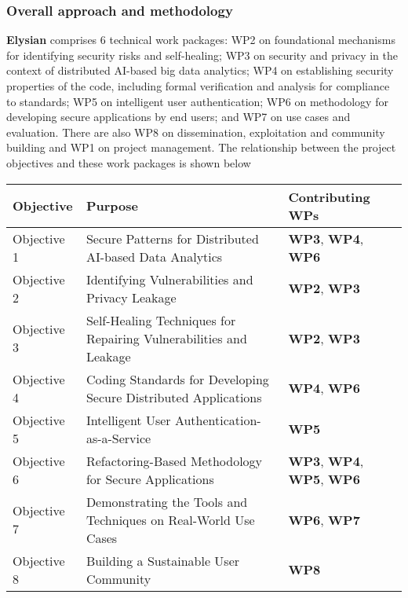 \documentclass[a4paper,11pt]{article}
\newcommand{\project}[1]{\textbf{#1}\xspace}
\newcommand{\SECURITY}{\project{Elysian}}
\newcommand{\TheProject}{\SECURITY}
\begin{document}
\subsubsection{Overall approach and methodology}


\TheProject{} comprises 6 technical work packages: WP2 on foundational mechanisms for identifying security risks and self-healing; WP3 on security and privacy in the context of distributed AI-based big data analytics; WP4 on establishing security properties of the code, including formal verification and analysis for compliance to standards;  WP5 on intelligent user authentication; WP6 on methodology for developing secure applications by end users; and WP7 on use cases and evaluation. There are also WP8 on dissemination, exploitation and community building and WP1 on project management. The relationship between the project objectives and these work packages is shown below

\vspace{-8pt}
\begin{center}
\begin{tabular}{|l|l|l|}\hline
\textbf{Objective} & \textbf{Purpose} & \textbf{Contributing WPs} \\\hline \hline
Objective 1 & Secure Patterns for Distributed AI-based Data Analytics & \textbf{WP3}, \textbf{WP4}, \textbf{WP6} \\\hline
Objective 2 & Identifying Vulnerabilities and Privacy Leakage & \textbf{WP2}, \textbf{WP3} \\\hline
Objective 3 & Self-Healing Techniques for Repairing Vulnerabilities and Leakage & \textbf{WP2}, \textbf{WP3} \\\hline
Objective 4 & Coding Standards for Developing Secure Distributed Applications & \textbf{WP4}, \textbf{WP6} \\\hline
Objective 5 & Intelligent User Authentication-as-a-Service & \textbf{WP5} \\\hline
Objective 6 & Refactoring-Based Methodology for Secure Applications & \textbf{WP3}, \textbf{WP4}, \textbf{WP5}, \textbf{WP6} \\\hline
Objective 7 & Demonstrating the Tools and Techniques on Real-World Use Cases & \textbf{WP6}, \textbf{WP7}\\\hline
Objective 8 & Building a Sustainable User Community & \textbf{WP8}\\\hline
\end{tabular}
\end{center}
\end{document}
